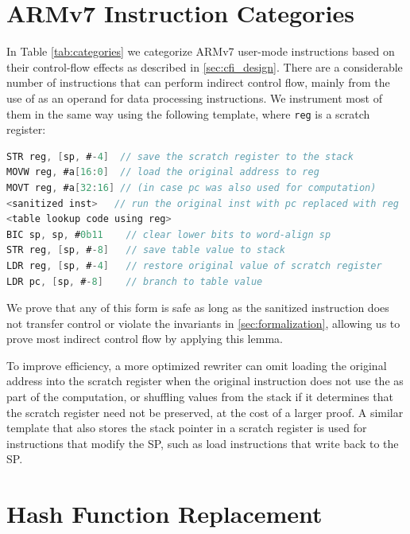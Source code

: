 \section{ARMv7 Instruction Categories}\label{sec:armv7_categories}

In Table \ref{tab:categories} we categorize ARMv7 user-mode instructions based on their control-flow effects as described in \autoref{sec:cfi_design}.
There are a considerable number of instructions that can perform indirect control flow, mainly from the use of \PC as an operand for data processing instructions.
We instrument most of them in the same way using the following template,
where \texttt{reg} is a scratch register:

\begin{lstlisting}[language=c, morekeywords={STR,MOVW,MOVT,BIC,LDR,reg,sp,pc}, linewidth=\linewidth,label={lst:armv7},xleftmargin=.3cm]
STR reg, [sp, #-4]  // save the scratch register to the stack
MOVW reg, #a[16:0]  // load the original address to reg
MOVT reg, #a[32:16] // (in case pc was also used for computation)
<sanitized inst>   // run the original inst with pc replaced with reg
<table lookup code using reg>
BIC sp, sp, #0b11    // clear lower bits to word-align sp
STR reg, [sp, #-8]   // save table value to stack
LDR reg, [sp, #-4]   // restore original value of scratch register
LDR pc, [sp, #-8]    // branch to table value
\end{lstlisting}

We prove that any \Block of this form is safe as long as the sanitized instruction does not transfer control or violate the invariants in \autoref{sec:formalization},
allowing us to prove most indirect control flow \Blocks by applying this lemma.

To improve efficiency, a more optimized rewriter can omit loading the original address into the scratch register when the original instruction does not use the \PC as part of the computation, 
or shuffling values from the stack if it determines that the scratch register need not be preserved, at the cost of a larger proof.
A similar \Block template that also stores the stack pointer in a scratch register is used for instructions that modify the SP,
such as load instructions that write back to the SP.

\section{Hash Function Replacement}\label{sec:hash_function}

